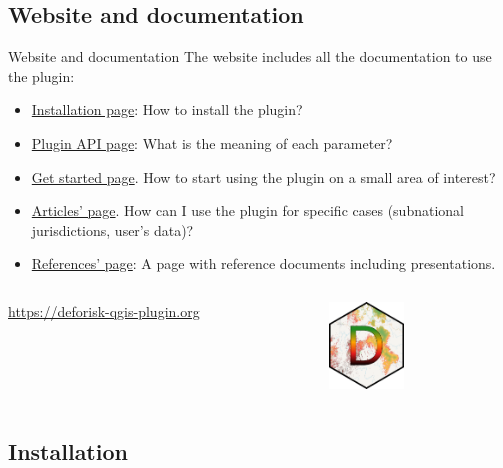 \documentclass[10pt,table,dvipsnames,compress]{beamer}
\begin{document}
\subsection{Website and documentation}
\label{sec:orgd6a1b3f}

\begin{frame}[label={sec:orgb622ffa}]{Website and documentation}
The website includes all the documentation to use the plugin:

\begin{itemize}
\item \href{https://deforisk-qgis-plugin.org/installation.html}{Installation page}: How to install the plugin?
\item \href{https://deforisk-qgis-plugin.org/plugin\_api.html}{Plugin API page}: What is the meaning of each parameter?
\item \href{https://deforisk-qgis-plugin.org/get\_started.html}{Get started page}. How to start using the plugin on a small area of interest?
\item \href{https://deforisk-qgis-plugin.org/articles.html}{Articles' page}. How can I use the plugin for specific cases (subnational jurisdictions, user's data)?
\item \href{https://deforisk-qgis-plugin.org/articles/references.html}{References' page}: A page with reference documents including presentations.
\end{itemize}

\begin{columns}
\begin{column}{0.5\columnwidth}
\flushright \url{https://deforisk-qgis-plugin.org}
\end{column}
\begin{column}{0.5\columnwidth}
\begin{center}
\includegraphics[width=2cm]{figs/logo-deforisk.png}
\end{center}
\end{column}
\end{columns}
\end{frame}

\subsection{Installation}
\label{sec:org724424f}
\end{document}
